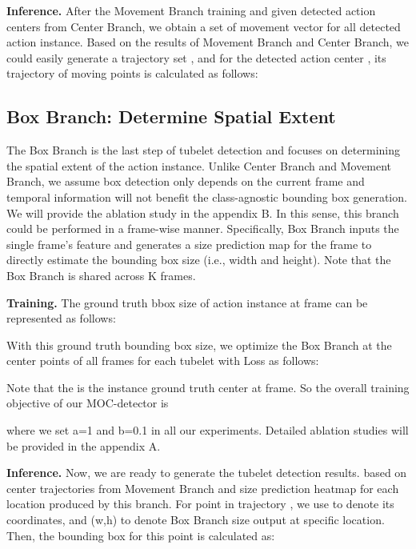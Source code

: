 \documentclass[runningheads]{llncs}
\begin{document}
\textbf{Inference.} After the Movement Branch training and given  detected action centers  from Center Branch, we obtain a set of movement vector  for all detected action instance. Based on the results of Movement Branch and Center Branch, we could easily generate a trajectory set , and for the detected action center , its trajectory of moving points is calculated as follows:


\subsection{Box Branch: Determine Spatial Extent}

The Box Branch is the last step of tubelet detection and focuses on determining the spatial extent of the action instance. Unlike Center Branch and Movement Branch, we assume box detection only depends on the current frame and temporal information will not benefit the class-agnostic bounding box generation. We will provide the ablation study in the appendix B. In this sense, this branch could be performed in a frame-wise manner. Specifically, Box Branch inputs the single frame's feature  and generates a size prediction map   for the  frame to directly estimate the bounding box size (i.e., width and height). Note that the Box Branch is shared across K frames.

\textbf{Training.}
The ground truth bbox size of  action instance at  frame can be represented as follows:

With this ground truth bounding box size, we optimize the Box Branch at the center points of all frames for each tubelet with  Loss as follows:

Note that the  is the  instance ground truth center at  frame.
So the overall training objective of our MOC-detector is

where we set a=1 and b=0.1 in all our experiments. Detailed ablation studies will be provided in the appendix A.

\textbf{Inference.} Now, we are ready to generate the tubelet detection results. based on center trajectories  from Movement Branch and
 size prediction heatmap  for each location produced by this branch. For  point in trajectory , we use  to denote its coordinates, and (w,h) to denote Box Branch size output  at specific location. Then, the bounding box for this point is calculated as:
 \begin{small}
 
\end{small}
\end{document}
